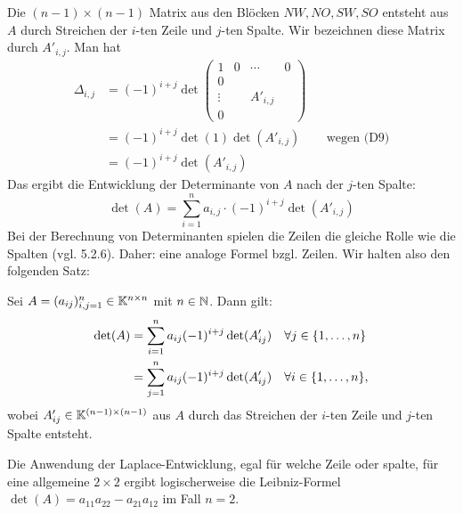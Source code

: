 Die $(n-1) \times (n-1)$ Matrix aus den Blöcken $NW,NO, SW,SO$ entsteht aus $A$ durch Streichen der $i$-ten Zeile und $j$-ten Spalte. Wir bezeichnen diese Matrix durch $ A'_{i,j} $. Man hat
\begin{align*}
	\Delta_{i,j} &= 
	(-1)^{i+j} \det\!\!\begin{pmatrix}
		1 & 0 & \cdots & 0 \\
		0 &&& \\
		\vdots && A'_{i,j} & \\
		0 &&&
	\end{pmatrix} \\
	&= (-1)^{i+j} \det(1) \det(A'_{i,j}) && \text{wegen (D9)} \\
	&= (-1)^{i+j} \det(A'_{i,j})
\end{align*}
Das ergibt die Entwicklung der Determinante von $ A $ nach der $ j $-ten Spalte:
\begin{equation}
	\det(A) = \sum_{i=1}^n a_{i,j} \cdot (-1)^{i+j} \det(A'_{i,j})
\end{equation}
Bei der Berechnung von Determinanten spielen die Zeilen die gleiche Rolle wie die Spalten (vgl. 5.2.6). Daher: eine analoge Formel bzgl. Zeilen. Wir halten also den folgenden Satz:

\begin{thm} 
	Sei $ A = (a_{ij}){}_{i,j=1}^n \in \mathbb K^{n \times n} $ mit $ n \in \mathbb N $. Dann gilt:
	\begin{align}
		\det(A) &= \sum_{i=1}^{n} a_{ij} (-1)^{i+j} \det(A'_{ij}) && \forall j \in \{ 1,\ldots,n \} \\
		&= \sum_{j=1}^{n} a_{ij} (-1)^{i+j} \det(A'_{ij}) && \forall i \in \{ 1,\ldots,n \},
	\end{align}
	wobei $ A'_{ij} \in \mathbb K^{(n-1) \times (n-1)} $ aus $ A $ durch das Streichen der $ i $-ten Zeile und $ j $-ten Spalte entsteht.
\end{thm}

\begin{bsp}[$n=2$]
	Die Anwendung der Laplace-Entwicklung, egal für welche Zeile oder spalte, für eine allgemeine $2 \times 2$ ergibt logischerweise die Leibniz-Formel $\det(A) = a_{11} a_{22} - a_{21} a_{12}$ im Fall $n=2$. 
\end{bsp}

